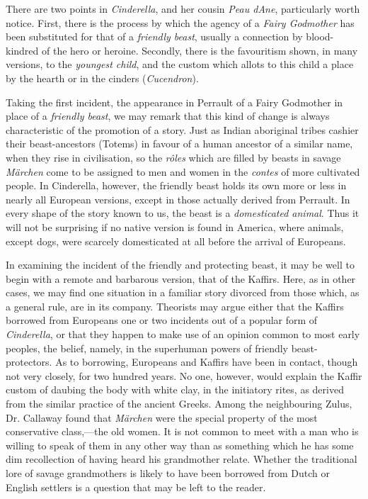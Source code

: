 \documentclass[14pt,a4paper]{memoir}
\begin{document}
{There are two points in \emph{Cinderella}, and her cousin \emph{Peau
d\textquotesingle Ane}, particularly worth notice. First, there is the
process by which the agency of a \emph{Fairy Godmother} has been
substituted for that of a \emph{friendly beast}, usually a connection by
blood-kindred of the hero or heroine. Secondly, there is the favouritism
shown, in many versions, to the \emph{youngest child}, and the custom
which allots to this child a place by the hearth or in the cinders
(\emph{Cucendron}).

Taking the first incident, the appearance in Perrault of a Fairy
Godmother in place of a \emph{friendly beast}, we may remark that this
kind of change is always characteristic of the promotion of a story.
Just as Indian \textquotesingle aboriginal\textquotesingle{} tribes
cashier their beast-ancestors (\textquotesingle Totems\textquotesingle)
in favour of a human ancestor of a similar name, when they rise in
civilisation, so the \emph{rôles} which are filled by beasts in savage
\emph{Märchen} come to be assigned to men and women in the \emph{contes}
of more cultivated
people.
In Cinderella, however, the friendly beast holds its own more or less in
nearly all European versions, except in those actually derived from
Perrault. In every shape of the story known to us, the beast is a
\emph{domesticated animal}. Thus it will not be surprising if no native
version is found in America, where animals, except dogs, were scarcely
domesticated at all before the arrival of Europeans.

In examining the incident of the friendly and protecting beast, it may
be well to begin with a remote and barbarous version, that of the
Kaffirs. Here, as in other cases, we may find one situation in a
familiar story divorced from those which, as a general rule, are in its
company. Theorists may argue either that the Kaffirs borrowed from
Europeans one or two incidents out of a popular form of
\emph{Cinderella}, or that they happen to make use of an opinion common
to most early peoples, the belief, namely, in the superhuman powers of
friendly beast-protectors. As to borrowing, Europeans and Kaffirs have
been in contact, though not very closely, for two hundred years. No one,
however, would explain the Kaffir custom of daubing the body with white
clay, in the initiatory rites, as derived from the similar practice of
the ancient
Greeks.
Among the neighbouring Zulus, Dr. Callaway found that \emph{Märchen}
were the special property of the most conservative class,---the old
women. \textquotesingle It is not common to meet with a man who is
willing to speak of them in any other way than as something which he has
some dim recollection of having heard his grandmother
relate.\textquotesingle{}
Whether the traditional lore of savage grandmothers is likely to have
been borrowed from Dutch or English settlers is a question that may be
left to the reader.

}
\end{document}
